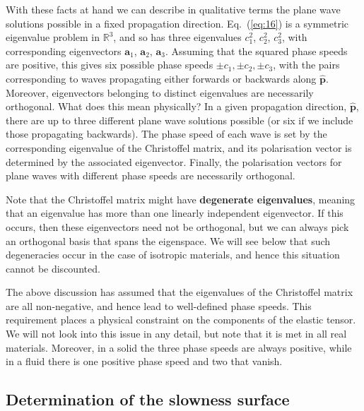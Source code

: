 With these facts at hand we can describe in qualitative terms the plane wave solutions possible in a fixed propagation direction. Eq.~(\ref{eq:16}) is a symmetric eigenvalue problem in $\mathbb{R}^{3}$, 
and so has three eigenvalues $c_{1}^{2}$, $c_{2}^{2}$, $c_{3}^{2}$, with corresponding eigenvectors $\mathbf{a}_{1}$, $\mathbf{a}_{2}$, $\mathbf{a}_{3}$. Assuming that the squared phase speeds 
are positive, this gives six possible phase speeds $\pm c_1, \pm c_{2}, \pm c_{3}$, with the pairs corresponding to waves propagating either forwards or backwards along $\hat{\mathbf{p}}$. Moreover, 
eigenvectors belonging to distinct eigenvalues are necessarily orthogonal. What does this mean physically? In a given propagation direction, $\hat{\mathbf{p}}$, there are up to three different plane wave solutions possible (or six if we include those propagating backwards). 
The phase speed of each wave is set by the corresponding eigenvalue of the Christoffel matrix, and its polarisation vector is determined by the associated eigenvector. Finally, the polarisation vectors for plane waves with different phase speeds are necessarily orthogonal.

Note that the Christoffel matrix might have \textbf{degenerate eigenvalues}, meaning that an eigenvalue has more than one linearly independent eigenvector. If this occurs, then these eigenvectors need not be orthogonal, but we 
can always pick an orthogonal basis that spans the eigenspace. We will see below that such degeneracies occur in the case of isotropic materials, and hence this situation cannot be discounted.

The above discussion has assumed that the eigenvalues of the Christoffel matrix are all non-negative, and hence lead to well-defined phase speeds. This requirement places a physical constraint on the components of the elastic tensor. 
We will not look into this issue in any detail, but note that it is met in all real materials. Moreover, in a solid the three phase speeds are always positive, while in a fluid there is one positive phase speed and two that vanish.

\subsection*{Determination of the slowness surface}

